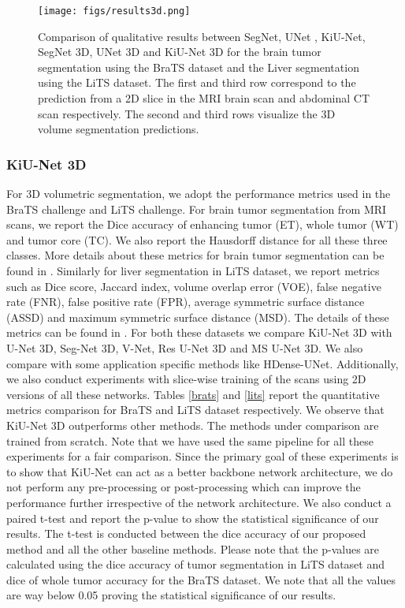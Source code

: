 \documentclass[journal,twoside,web]{ieeecolor}
\begin{document}
\begin{figure*}[htbp!]
	\centering
	\texttt{[image: figs/results3d.png]}\\
	
	
	\caption{Comparison of qualitative results between SegNet, UNet , KiU-Net, SegNet 3D, UNet 3D and KiU-Net 3D for the brain tumor segmentation using the BraTS dataset and the Liver segmentation using the LiTS dataset. The first and third row correspond to the prediction from a 2D slice in the MRI brain scan and abdominal CT scan respectively. The second and third rows visualize the 3D volume segmentation predictions.    }
	\label{res2}
	
\end{figure*} 

\subsubsection{KiU-Net 3D}

For 3D volumetric segmentation, we adopt the performance metrics used in the BraTS challenge and LiTS challenge. For brain tumor segmentation from MRI scans, we report the Dice accuracy of enhancing tumor (ET), whole tumor (WT) and tumor core (TC). We also report the Hausdorff distance for all these three classes. More details about these metrics for brain tumor segmentation can be found in \cite{bakas2018identifying}. Similarly for liver segmentation in LiTS dataset, we report metrics such as Dice score, Jaccard index, volume overlap error (VOE), false negative rate (FNR), false positive rate (FPR),  average symmetric surface distance (ASSD)   and maximum symmetric surface distance (MSD). The details of these metrics can be found in \cite{bilic2019liver}. For both these datasets we compare KiU-Net 3D with U-Net 3D, Seg-Net 3D, V-Net, Res U-Net 3D and MS U-Net 3D. We also compare with some application specific methods like HDense-UNet. Additionally,  we also conduct experiments with  slice-wise training of the scans using 2D versions of all these networks. Tables \ref{brats} and \ref{lits} report the quantitative metrics comparison for BraTS and LiTS dataset respectively.  We observe that KiU-Net 3D outperforms  other methods. The methods under comparison are trained from scratch. Note that we have used the same pipeline for all these experiments for a fair comparison. Since the primary goal of these experiments is to show that KiU-Net can act as a better backbone network architecture, we do not perform  any pre-processing or post-processing   which can  improve the performance further irrespective of the network architecture. We also conduct a paired t-test and report the p-value to show the statistical significance of our results. The t-test is conducted between the dice accuracy of our proposed method and all the other baseline methods. Please note that
the p-values are calculated using the dice accuracy of tumor segmentation in LiTS dataset and dice of whole tumor accuracy for the BraTS dataset. We note that all the values are way below 0.05 proving the statistical significance of our results.
\end{document}
